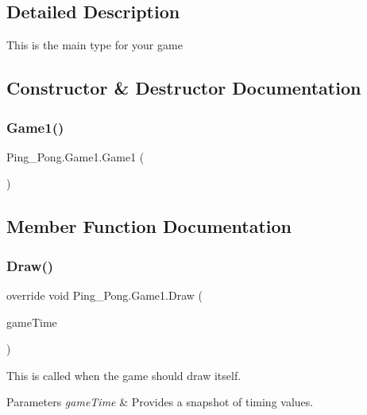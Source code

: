 \subsection{Detailed Description}
This is the main type for your game 



\subsection{Constructor \& Destructor Documentation}
\mbox{\label{class_ping___pong_1_1_game1_ab146cd91df1ef58f9a58935843ed787b}} 
\subsubsection{\texorpdfstring{Game1()}{Game1()}}
{\footnotesize\ttfamily Ping\+\_\+\+Pong.\+Game1.\+Game1 (\begin{DoxyParamCaption}{ }\end{DoxyParamCaption})}



\subsection{Member Function Documentation}
\mbox{\label{class_ping___pong_1_1_game1_a4ce721b84f4194ecc1a8bf27b27f0955}} 
\subsubsection{\texorpdfstring{Draw()}{Draw()}}
{\footnotesize\ttfamily override void Ping\+\_\+\+Pong.\+Game1.\+Draw (\begin{DoxyParamCaption}\item[{Game\+Time}]{game\+Time }\end{DoxyParamCaption})\hspace{0.3cm}{\ttfamily [protected]}}



This is called when the game should draw itself. 


\begin{DoxyParams}{Parameters}
{\em game\+Time} & Provides a snapshot of timing values.\\
\hline
\end{DoxyParams}
\mbox{\label{class_ping___pong_1_1_game1_a5e2d8c065ebbe30b5452d6e6366d21ff}} 
